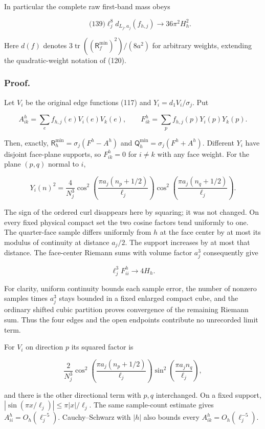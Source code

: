 In particular the complete raw first-band mass obeys

\[
\qquad\text{(139)}
 \ell_j^8d_{L_j,a_j}(f_{h,j})\longrightarrow36\pi^2 H_h^2.
\]

Here \(d(f)\) denotes
\(3\operatorname{tr}((\mathsf R_f^{\min})^2)/(8a^2)\) for arbitrary
weights, extending the quadratic-weight notation of (120).

\subsubsection{Proof.}\label{local-energy-band-transfer-md-proof.}

Let \(V_i\) be the original edge functions (117) and
\(Y_i=d_1V_i/\sigma_j\). Put

\[
A^h_{ik}=\sum_ef_{h,j}(e)V_i(e)V_k(e),\qquad
 F^h_{ik}=\sum_pf_{h,j}(p)Y_i(p)Y_k(p).
\]

Then, exactly, \(\mathsf R_h^{\min}=\sigma_j(F^h-A^h)\) and
\(\mathsf Q_h^{\min}=\sigma_j(F^h+A^h)\). Different \(Y_i\) have
disjoint face-plane supports, so \(F^h_{ik}=0\) for \(i\ne k\) with any
face weight. For the plane \((p,q)\) normal to \(i\),

\[
Y_i(n)^2=\frac4{N_j^3}
 \cos^2\left(\frac{\pi a_j(n_p+1/2)}{\ell_j}\right)
 \cos^2\left(\frac{\pi a_j(n_q+1/2)}{\ell_j}\right).
\]

The sign of the ordered curl disappears here by squaring; it was not
changed. On every fixed physical compact set the two cosine factors tend
uniformly to one. The quarter-face sample differs uniformly from \(h\)
at the face center by at most its modulus of continuity at distance
\(a_j/2\). The support increases by at most that distance. The
face-center Riemann sums with volume factor \(a_j^3\) consequently give

\[
\ell_j^3 F^h_{ii}\longrightarrow4H_h.
\]

For clarity, uniform continuity bounds each sample error, the number of
nonzero samples times \(a_j^3\) stays bounded in a fixed enlarged
compact cube, and the ordinary shifted cubic partition proves
convergence of the remaining Riemann sum. Thus the four edges and the
open endpoints contribute no unrecorded limit term.

For \(V_i\) on direction \(p\) its squared factor is

\[
\frac2{N_j^3}
 \cos^2\left(\frac{\pi a_j(n_p+1/2)}{\ell_j}\right)
 \sin^2\left(\frac{\pi a_jn_q}{\ell_j}\right),
\]

and there is the other directional term with \(p,q\) interchanged. On a
fixed support, \(|\sin(\pi x/\ell_j)|\le\pi|x|/\ell_j\). The same
sample-count estimate gives \(A^h_{ii}=O_h(\ell_j^{-5})\).
Cauchy--Schwarz with \(|h|\) also bounds every
\(A^h_{ik}=O_h(\ell_j^{-5})\).

